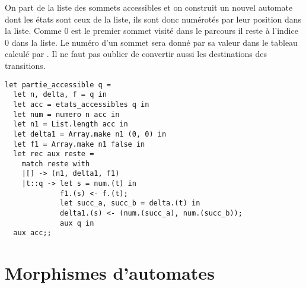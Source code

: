 \begin{Exercise}
On part de la liste des sommets accessibles et on construit un nouvel automate dont les états sont ceux de la liste, ils sont donc numérotés par leur position dans la liste. Comme 0 est le premier sommet visité dans le parcours il reste à l'indice 0 dans la liste. Le numéro d'un sommet sera donné par sa valeur dans le tableau calculé par . Il ne faut pas oublier de convertir aussi les destinations des transitions.
\begin{lstlisting}
let partie_accessible q =
  let n, delta, f = q in
  let acc = etats_accessibles q in
  let num = numero n acc in
  let n1 = List.length acc in
  let delta1 = Array.make n1 (0, 0) in
  let f1 = Array.make n1 false in
  let rec aux reste =
    match reste with
    |[] -> (n1, delta1, f1)
    |t::q -> let s = num.(t) in
             f1.(s) <- f.(t);             
             let succ_a, succ_b = delta.(t) in
             delta1.(s) <- (num.(succ_a), num.(succ_b));
             aux q in
  aux acc;;

\end{lstlisting}

\end{Exercise}
\section{Morphismes d'automates}
